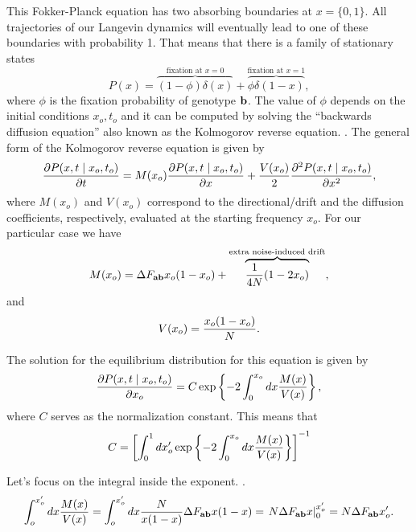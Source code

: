 This Fokker-Planck equation has two absorbing boundaries at $x = \{0, 1 \}$. All
trajectories of our Langevin dynamics will eventually lead to one of these
boundaries with probability 1. That means that there is a family of stationary
states
\begin{equation}
  P(x) = \overbrace{(1 - \phi) \delta(x)}^{\text{fixation at }x=0} +
         \overbrace{\phi \delta(1 - x)}^{\text{fixation at }x=1},
\end{equation}
where $\phi$ is the fixation probability of genotype $\mathbf{b}$. The value of
$\phi$ depends on the initial conditions $x_o, t_o$ and it can be computed by
solving the ``backwards diffusion equation'' also known as the Kolmogorov
reverse equation. . The general form of the Kolmogorov reverse
equation is given by
\begin{equation}
  {\partial P(x, t \mid x_o, t_o) \over \partial t} =
  M(x_o) {\partial P(x, t \mid x_o, t_o) \over \partial x} +
  {V(x_o) \over 2} {\partial^2 P(x, t \mid x_o, t_o) \over \partial x^2},
\end{equation}
where $M(x_o)$ and $V(x_o)$ correspond to the directional/drift and the
diffusion coefficients, respectively, evaluated at the starting frequency $x_o$.
For our particular case we have
\begin{equation}
  M(x_o) = \Delta F_{\mathbf{ab}} x_o (1 - x_o) + \overbrace{{1 \over 4N} (1 - 2x_o)}^
  {\text{extra noise-induced drift}},
\end{equation}
and
\begin{equation}
  V(x_o) = {x_o (1 - x_o) \over N}.
\end{equation}

The solution for the equilibrium distribution for this equation is given by
\begin{equation}
  {\partial P(x, t \mid x_o, t_o) \over \partial x_o} =
  C \exp \left\{ -2 \int_0^{x_o} dx {M(x) \over V(x)} \right\},
\end{equation}
where $C$ serves as the normalization constant. This means that
\begin{equation}
  C = \left[ \int_0^1 dx_o'
      \exp \left\{ -2 \int_0^{x_o} dx {M(x) \over V(x)} \right\} \right]^{-1}
\end{equation}

Let's focus on the integral inside the exponent.
.
\begin{equation}
  \int_o^{x_o'} dx {M(x) \over V(x)} =
  \int_o^{x_o'} dx {N \over x (1 - x)} \Delta F_{\mathbf{ab}} x(1 - x) =
  \left. N \Delta F_{\mathbf{ab}} x \right\rvert_0^{x_o'} = N \Delta F_{\mathbf{ab}} x_o'.
\end{equation}

